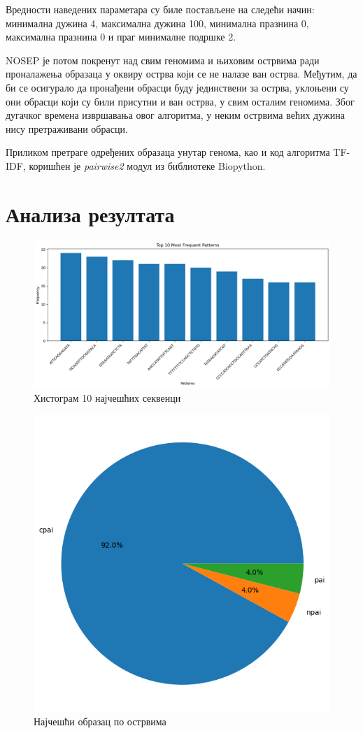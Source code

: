 \documentclass[12pt]{article}
\begin{document}
Вредности наведених параметара су биле постављене на следећи начин: минимална дужина 4, максимална дужина 100, минимална празнина 0, максимална празнина 0 и праг минималне подршке 2.

NOSEP је потом покренут над свим геномима и њиховим острвима ради проналажења образаца у оквиру острва који се не налазе ван острва. Међутим, да би се осигурало да пронађени обрасци буду јединствени за острва, уклоњени су они обрасци који су били присутни и ван острва, у свим осталим геномима. Због дугачког времена извршавања овог алгоритма, у неким острвима већих дужина нису претраживани обрасци.

Приликом претраге одређених образаца унутар генома, као и код алгоритма TF-IDF, коришћен је \textit{pairwise2} модул из библиотеке Biopython.

\section{Анализа резултата}

\begin{figure}[h]
    \centering
    \includegraphics[width=\linewidth]{images/top_10_hist.png}
    \caption{Хистограм 10 најчешћих секвенци}
    \label{fig:top10hist}
\end{figure}

\begin{figure}[h]
    \centering
    \includegraphics[width=0.5\linewidth]{images/top_1_by_islands.png}
    \caption{Најчешћи образац по острвима}
    \label{fig:top1}
\end{figure}
\end{document}
